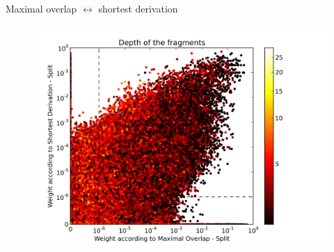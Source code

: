 \documentclass{beamer}
\begin{document}
\begin{frame}{Maximal overlap $\leftrightarrow$ shortest derivation}
\begin{figure}
\includegraphics[width=\linewidth,trim=0.5cm 0cm 2.5cm 0.5cm, clip=true]{../data/plots/0.png}
\end{figure}
\end{frame}
\end{document}
